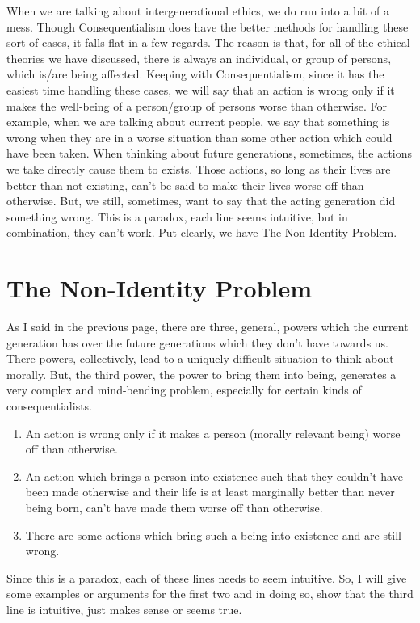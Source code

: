 When we are talking about intergenerational ethics, we do run into a bit of a mess. Though Consequentialism does have the better methods for handling these sort of cases, it falls flat in a few regards. The reason is that, for all of the ethical theories we have discussed, there is always an individual, or group of persons, which is/are being affected. Keeping with Consequentialism, since it has the easiest time handling these cases, we will say that an action is wrong only if it makes the well-being of a person/group of persons worse than otherwise. For example, when we are talking about current people, we say that something is wrong when they are in a worse situation than some other action which could have been taken. When thinking about future generations, sometimes, the actions we take directly cause them to exists. Those actions, so long as their lives are better than not existing, can't be said to make their lives worse off than otherwise. But, we still, sometimes, want to say that the acting generation did something wrong. This is a paradox, each line seems intuitive, but in combination, they can't work. Put clearly, we have The Non-Identity Problem.

\section{The Non-Identity Problem}
As I said in the previous page, there are three, general, powers which the current generation has over the future generations which they don't have towards us. There powers, collectively, lead to a uniquely difficult situation to think about morally. But, the third power, the power to bring them into being, generates a very complex and mind-bending problem, especially for certain kinds of consequentialists. 

\begin{enumerate}
    \item An action is wrong only if it makes a person (morally relevant being) worse off than otherwise.
    \item An action which brings a person into existence such that they couldn’t have been made otherwise and their life is at least marginally better than never being born, can’t have made them worse off than otherwise.
    \item There are some actions which bring such a being into existence and are still wrong.
\end{enumerate}

Since this is a paradox, each of these lines needs to seem intuitive. So, I will give some examples or arguments for the first two and in doing so, show that the third line is intuitive, just makes sense or seems true. 
